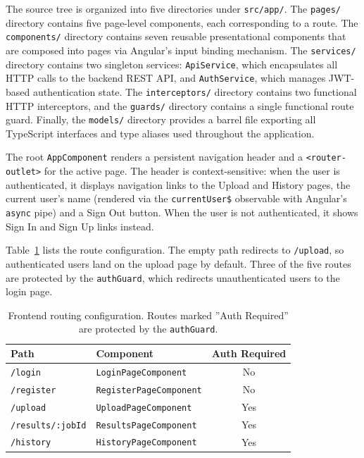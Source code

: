 The source tree is organized into five directories under \texttt{src/app/}. The \texttt{pages/} directory contains five page-level components, each corresponding to a route. The \texttt{components/} directory contains seven reusable presentational components that are composed into pages via Angular's input binding mechanism. The \texttt{services/} directory contains two singleton services: \texttt{ApiService}, which encapsulates all HTTP calls to the backend REST API, and \texttt{AuthService}, which manages JWT-based authentication state. The \texttt{interceptors/} directory contains two functional HTTP interceptors, and the \texttt{guards/} directory contains a single functional route guard. Finally, the \texttt{models/} directory provides a barrel file exporting all TypeScript interfaces and type aliases used throughout the application.

The root \texttt{AppComponent} renders a persistent navigation header and a \texttt{<rou\-ter-out\-let>} for the active page. The header is context-sensitive: when the user is authenticated, it displays navigation links to the Upload and History pages, the current user's name (rendered via the \texttt{currentUser\$} observable with Angular's \texttt{async} pipe) and a Sign Out button. When the user is not authenticated, it shows Sign In and Sign Up links instead.

Table~\ref{tab:frontend-routes} lists the route configuration. The empty path redirects to \texttt{/upload}, so authenticated users land on the upload page by default. Three of the five routes are protected by the \texttt{authGuard}, which redirects unauthenticated users to the login page.

\begin{table}[htbp]
    \centering
    \footnotesize
    \begin{tabular}{|l|l|c|}
        \hline
        \textbf{Path}            & \textbf{Component}             & \textbf{Auth Required} \\
        \hline\hline
        \texttt{/login}          & \texttt{LoginPageComponent}    & No                     \\
        \hline
        \texttt{/register}       & \texttt{RegisterPageComponent} & No                     \\
        \hline
        \texttt{/upload}         & \texttt{UploadPageComponent}   & Yes                    \\
        \hline
        \texttt{/results/:jobId} & \texttt{ResultsPageComponent}  & Yes                    \\
        \hline
        \texttt{/history}        & \texttt{HistoryPageComponent}  & Yes                    \\
        \hline
    \end{tabular}
    \caption{Frontend routing configuration. Routes marked ''Auth Required'' are protected by the \texttt{authGuard}.}
    \label{tab:frontend-routes}
\end{table}

